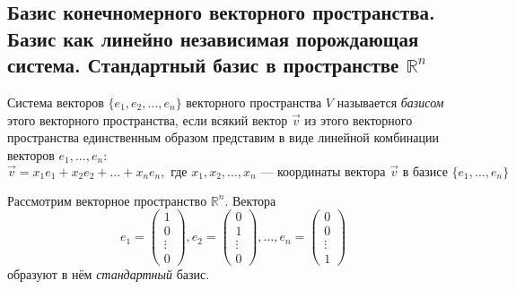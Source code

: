 \documentclass[a4paper, 12pt]{article}
\begin{document}
\subsection{Базис конечномерного векторного пространства. Базис как линейно независимая порождающая система. Стандартный базис в пространстве $\mathbb{R}^n$}
Система векторов $\{e_1, e_2, \ldots, e_n\}$ векторного пространства $V$ называется \textit{базисом} этого векторного пространства, если всякий вектор $\vec{v}$ из этого векторного пространства единственным образом представим в виде линейной комбинации векторов ${e_{1}, \ldots, e_{n}}$:
\[\vec{v} = x_1 e_1 + x_2 e_2 + \ldots + x_n e_n, \text{ где $x_1, x_2, \ldots, x_n$ — координаты вектора $\vec{v}$ в базисе $\{e_1, \ldots, e_n\}$}\]

Рассмотрим векторное пространство $\mathbb{R}^n$. Вектора
\[e_1 = \begin{pmatrix} 1 \\ 0 \\ \vdots \\ 0 \end{pmatrix},
e_2 = \begin{pmatrix} 0 \\ 1 \\ \vdots \\ 0 \end{pmatrix}
, \ldots, 
e_n = \begin{pmatrix} 0 \\ 0 \\ \vdots \\ 1 \end{pmatrix}\]
образуют в нём \textit{стандартный} базис.
\end{document}
